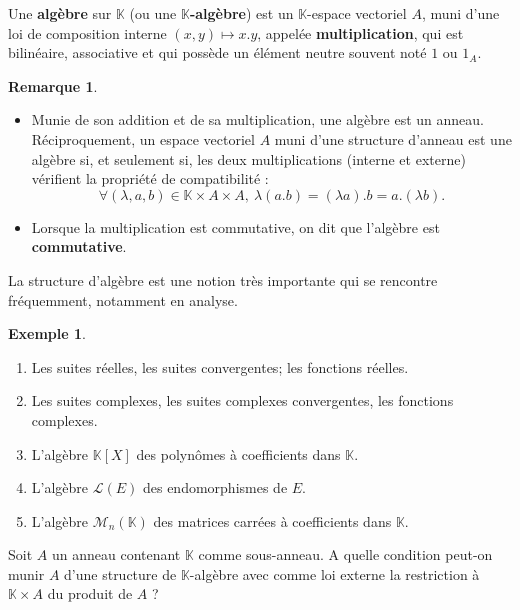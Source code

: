 \documentclass[french]{article}
\newcommand{\K}{\mathbb{K}}
\theoremstyle{plain}
\theoremstyle{definition}
\newtheorem*{ex}{Exemple}
\newtheorem*{rmq}{Remarque}
\theoremstyle{remark}
\begin{document}
\begin{dfn}
	Une \textbf{algèbre} sur $\K$ (ou une \textbf{$\K$-algèbre}) est un $\K$-espace vectoriel $A$, muni d'une loi de composition interne $(x,y)\mapsto x.y$, appelée \textbf{multiplication}, qui est bilinéaire, associative et qui possède un élément neutre souvent noté $1$ ou $1_A$.
\end{dfn}

\begin{rmq}
	\begin{itemize}
		\item Munie de son addition et de sa multiplication, une algèbre est un anneau. \\ Réciproquement, un espace vectoriel $A$ muni d'une structure d'anneau est une algèbre si, et seulement si, les deux multiplications (interne et externe) vérifient la propriété de compatibilité : $$\forall (\lambda,a,b)\in\K\times A\times A,\ \lambda(a.b)=(\lambda a).b=a.(\lambda b).$$%
		\item Lorsque la multiplication est commutative, on dit que l'algèbre est \textbf{commutative}.
	\end{itemize}
\end{rmq}

La structure d'algèbre est une notion très importante qui se rencontre fréquemment, notamment en analyse.

\begin{ex}
	\begin{enumerate}
		\item Les suites réelles, les suites convergentes; les fonctions réelles.
		\item Les suites complexes, les suites complexes convergentes, les fonctions complexes.
		\item L'algèbre $\K[X]$ des polynômes à coefficients dans $\K$.
		\item L'algèbre $\mathcal{L}(E)$ des endomorphismes de $E$.
		\item L'algèbre $\mathcal{M}_n(\K)$ des matrices carrées à coefficients dans $\K$.
	\end{enumerate}
\end{ex}

\begin{exo}
	Soit $A$ un anneau contenant $\K$ comme sous-anneau. A quelle condition peut-on munir $A$ d'une structure de $\K$-algèbre avec comme loi externe la restriction à $\K\times A$ du produit de $A$ ?
\end{exo}
\end{document}
